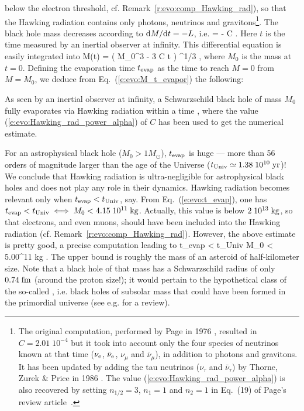 below the electron threshold, cf. Remark~\ref{r:evo:comp_Hawking_rad}), so that the Hawking radiation
contains only photons, neutrinos and gravitons\footnote{The original computation,
performed by Page in 1976 \cite{Page76}, resulted
in $C=2.01\; 10^{-4}$ but it took into account only the four species
of neutrinos known at that time ($\nu_{\rm e}$, $\bar{\nu}_{\rm e}$, $\nu_\mu$ and
$\bar{\nu}_\mu$), in addition to photons and gravitons. It has been updated
by adding the tau neutrinos ($\nu_\tau$ and $\bar{\nu}_\tau$)
by Thorne, Zurek \& Price in 1986 \cite{ThornZP86}.
The value (\ref{e:evo:Hawking_rad_power_alpha}) is also recovered by
setting $n_{1/2}=3$, $n_1=1$ and $n_2=1$ in Eq.~(19) of Page's review article~\cite{Page05}.}.
The black hole mass decreases according to $\mathrm{d} M/\mathrm{d} t = - L$, i.e.
\be \label{e:evo:Hawking_rad_mass_decrease}
     = - C  .
\ee
Here $t$ is the time measured by an inertial observer at infinity.
This differential equation is easily integrated into
\be \label{e:evo:M_t_evapor}
    M(t) = \left( M_0^3 - 3 C \hbar t \right) ^{1/3} ,
\ee
where $M_0$ is the mass at $t=0$. Defining the evaporation time $t_{\rm evap}$
as the time to reach $M=0$ from $M = M_0$, we deduce from Eq.~(\ref{e:evo:M_t_evapor}) the
following:

\begin{prop}
As seen by an inertial observer at infinity, a Schwarzschild black hole of mass $M_0$ fully evaporates via Hawking radiation within a time
\be \label{e:evo:t_evap}
     ,
\ee
where the value (\ref{e:evo:Hawking_rad_power_alpha}) of $C$ has been used
to get the numerical estimate.
\end{prop}

For an astrophysical black hole ($M_0 >  1 M_\odot$), $t_{\rm evap} $ is
huge --- more than 56
orders of magnitude larger than the age of the Universe ($t_{\rm Univ} \simeq 1.38\; 10^{10} {\rm\; yr}$)!
We conclude that Hawking radiation is ultra-negligible
for astrophysical black holes and
does not play any role in their dynamics. Hawking radiation becomes relevant only when
$t_{\rm evap} < t_{\rm Univ}$, say. From Eq.~(\ref{e:evo:t_evap}), one has
$t_{\rm evap} < t_{\rm Univ} \iff M_0 < 4.15\; 10^{11} {\rm\; kg}$. Actually, this value
is below $2\; 10^{13}{\rm\; kg}$, so that electrons, and even muons, should have been included into the Hawking radiation
(cf. Remark~\ref{r:evo:comp_Hawking_rad}). However, the above estimate is pretty good, a precise computation leading to \cite{MacGiCP08}
\be
    t_{\rm evap} < t_{\rm Univ} \iff M_0 < 5.00^{11} {\rm\; kg} .
\ee
The upper bound is roughly the mass of an asteroid of half-kilometer size.
Note that a black hole of that mass has a Schwarzschild radius
of only $0.74{\rm \; fm}$ (around the proton size!); it
would pertain to the hypothetical class
of the so-called
,
i.e. black holes of subsolar mass that could have been formed in the primordial universe
(see e.g. \cite{CarrKSY21} for a review).


